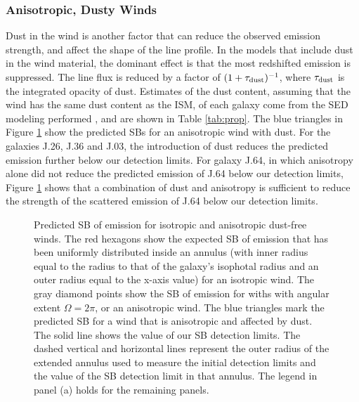 \documentclass[twocolumn]{aastex61}
\begin{document}
\subsubsection{Anisotropic, Dusty Winds}

Dust in the wind is another factor that can reduce the observed emission strength, and affect the shape of the line profile. 
In the \cite{Prochaska_2011} models that include dust in the wind material, the dominant effect is that the most redshifted emission is suppressed. The line flux is reduced by a factor of $(1+\tau_{\rm{dust}})^{-1}$, where $\tau_{\rm{dust}}$ is the integrated opacity of dust. Estimates of the dust content, assuming that the wind has the same dust content as the ISM, of each galaxy come from the SED modeling performed \cite{Rubin_2014}, and are shown in Table \ref{tab:prop}. The blue triangles in Figure \ref{fig.emission} show the predicted SBs for an anisotropic wind with dust. For the galaxies J.26, J.36 and J.03, the introduction of dust reduces the predicted emission further below our detection limits. For galaxy J.64, in which anisotropy alone did not reduce the predicted emission of J.64 below our detection limits, Figure \ref{fig.emission} shows that a combination of dust and anisotropy is sufficient to reduce the strength of the scattered emission of J.64 below our detection limits. 

\begin{figure}[h]
\centering
{}
\caption{Predicted SB of  emission for isotropic and anisotropic dust-free winds. The red hexagons show the expected SB of emission that has been uniformly distributed inside an annulus (with inner radius equal to the radius to that of the galaxy's isophotal radius and an outer radius equal to the x-axis value) for an isotropic wind. The gray diamond points show the SB of  emission for withs with angular extent $\Omega=2\pi$, or an anisotropic wind. The blue triangles mark the predicted SB for a wind that is anisotropic and affected by dust. The solid line shows the value of our SB detection limits. The dashed vertical and horizontal lines represent the outer radius of the extended annulus used to measure the initial detection limits and the value of the SB detection limit in that annulus. The legend in panel (a) holds for the remaining panels.}
\label{fig.emission}
\end{figure}
\end{document}
